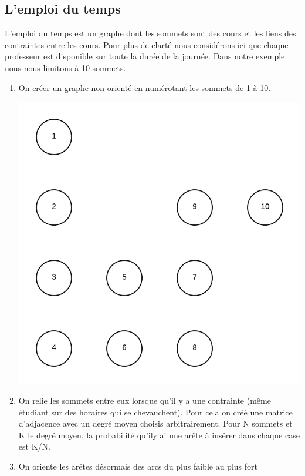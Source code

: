 \documentclass[a4paper,11pt]{article}
\begin{document}
	\subsection{L'emploi du temps}
		L'emploi du temps est un graphe dont les sommets sont des cours et les liens des contraintes entre les cours.
		Pour plus de clarté nous considérons ici que chaque professeur est disponible sur toute la durée de la journée.
		Dans notre exemple nous nous limitons à 10 sommets.
		\begin{enumerate}
			\item On créer un graphe non orienté en numérotant les sommets de 1 à 10.
			\centerline{\includegraphics[scale=0.8]{Captures/exemple1.png}}
			\item On relie les sommets entre eux lorsque qu'il y a une contrainte (même étudiant sur des horaires qui se chevauchent). Pour cela on créé une matrice d'adjacence avec un degré moyen choisis arbitrairement. Pour N sommets et K le degré moyen, la probabilité qu'ily ai une arête à insérer dans chaque case est K/N.
			\item On oriente les arêtes désormais des arcs du plus faible au plus fort

\end{enumerate}
\end{document}
